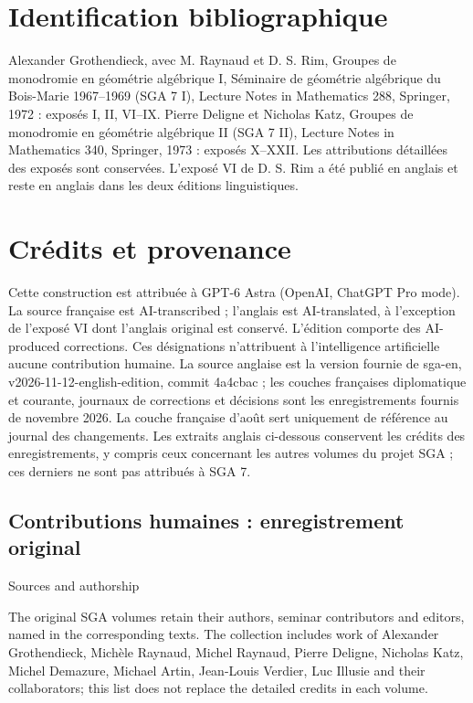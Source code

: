 \section*{Identification bibliographique}

Alexander Grothendieck, avec M. Raynaud et D. S. Rim, Groupes de monodromie en géométrie algébrique I, Séminaire de géométrie algébrique du Bois-Marie 1967–1969 (SGA 7 I), Lecture Notes in Mathematics 288, Springer, 1972 : exposés I, II, VI–IX. Pierre Deligne et Nicholas Katz, Groupes de monodromie en géométrie algébrique II (SGA 7 II), Lecture Notes in Mathematics 340, Springer, 1973 : exposés X–XXII. Les attributions détaillées des exposés sont conservées. L’exposé VI de D. S. Rim a été publié en anglais et reste en anglais dans les deux éditions linguistiques.

\section*{Crédits et provenance}

Cette construction est attribuée à GPT-6 Astra (OpenAI, ChatGPT Pro mode). La source française est AI-transcribed ; l’anglais est AI-translated, à l’exception de l’exposé VI dont l’anglais original est conservé. L’édition comporte des AI-produced corrections. Ces désignations n’attribuent à l’intelligence artificielle aucune contribution humaine. La source anglaise est la version fournie de sga-en, v2026-11-12-english-edition, commit 4a4cbac ; les couches françaises diplomatique et courante, journaux de corrections et décisions sont les enregistrements fournis de novembre 2026. La couche française d’août sert uniquement de référence au journal des changements. Les extraits anglais ci-dessous conservent les crédits des enregistrements, y compris ceux concernant les autres volumes du projet SGA ; ces derniers ne sont pas attribués à SGA 7.

\subsection*{Contributions humaines : enregistrement original}

Sources and authorship

The original SGA volumes retain their authors, seminar contributors and editors, named in the corresponding texts. The collection includes work of Alexander Grothendieck, Michèle Raynaud, Michel Raynaud, Pierre Deligne, Nicholas Katz, Michel Demazure, Michael Artin, Jean-Louis Verdier, Luc Illusie and their collaborators; this list does not replace the detailed credits in each volume.

